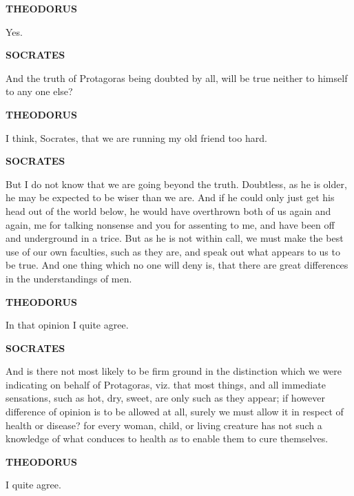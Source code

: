 \documentclass[11pt,letter]{article}
\begin{document}
\par \textbf{THEODORUS}
\par   Yes.

\par \textbf{SOCRATES}
\par   And the truth of Protagoras being doubted by all, will be true neither to himself to any one else?

\par \textbf{THEODORUS}
\par   I think, Socrates, that we are running my old friend too hard.

\par \textbf{SOCRATES}
\par   But I do not know that we are going beyond the truth. Doubtless, as he is older, he may be expected to be wiser than we are. And if he could only just get his head out of the world below, he would have overthrown both of us again and again, me for talking nonsense and you for assenting to me, and have been off and underground in a trice. But as he is not within call, we must make the best use of our own faculties, such as they are, and speak out what appears to us to be true. And one thing which no one will deny is, that there are great differences in the understandings of men.

\par \textbf{THEODORUS}
\par   In that opinion I quite agree.

\par \textbf{SOCRATES}
\par   And is there not most likely to be firm ground in the distinction which we were indicating on behalf of Protagoras, viz. that most things, and all immediate sensations, such as hot, dry, sweet, are only such as they appear; if however difference of opinion is to be allowed at all, surely we must allow it in respect of health or disease? for every woman, child, or living creature has not such a knowledge of what conduces to health as to enable them to cure themselves.

\par \textbf{THEODORUS}
\par   I quite agree.
\end{document}
